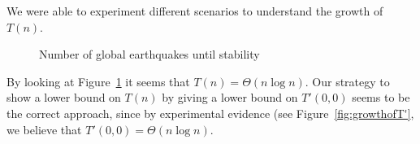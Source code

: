 \documentclass[runningheads,a4paper]{llncs}
\begin{document}
We were able to experiment different scenarios to understand the growth of $T(n)$. 
\begin{figure}[!ht]
\centering
{} \qquad
{}
\caption{Number of global earthquakes until stability}
\label{fig:growthofT}
\end{figure}

By looking at Figure~\ref{fig:growthofT} it seems that $T(n) = \Theta(n\log n)$. Our strategy to show a lower bound on $T(n)$ by giving a lower bound on $T'(0,0)$ seems to be the correct approach, since by experimental evidence (see Figure~\ref{fig:growthofT'}, we believe that $T'(0,0) = \Theta(n\log n)$.
\end{document}
